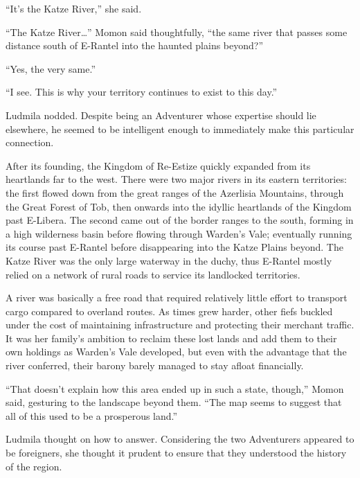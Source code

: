  

“It’s the Katze River,” she said.

 

“The Katze River…” Momon said thoughtfully, “the same river that passes some distance south of E-Rantel into the haunted plains beyond?”

 

“Yes, the very same.”

 

“I see. This is why your territory continues to exist to this day.”

 

Ludmila nodded. Despite being an Adventurer whose expertise should lie elsewhere, he seemed to be intelligent enough to immediately make this particular connection.

 

After its founding, the Kingdom of Re-Estize quickly expanded from its heartlands far to the west. There were two major rivers in its eastern territories: the first flowed down from the great ranges of the Azerlisia Mountains, through the Great Forest of Tob, then onwards into the idyllic heartlands of the Kingdom past E-Libera. The second came out of the border ranges to the south, forming in a high wilderness basin before flowing through Warden’s Vale; eventually running its course past E-Rantel before disappearing into the Katze Plains beyond. The Katze River was the only large waterway in the duchy, thus E-Rantel mostly relied on a network of rural roads to service its landlocked territories.

 

A river was basically a free road that required relatively little effort to transport cargo compared to overland routes. As times grew harder, other fiefs buckled under the cost of maintaining infrastructure and protecting their merchant traffic. It was her family’s ambition to reclaim these lost lands and add them to their own holdings as Warden’s Vale developed, but even with the advantage that the river conferred, their barony barely managed to stay afloat financially.

 

“That doesn’t explain how this area ended up in such a state, though,” Momon said, gesturing to the landscape beyond them. “The map seems to suggest that all of this used to be a prosperous land.”

 

Ludmila thought on how to answer. Considering the two Adventurers appeared to be foreigners, she thought it prudent to ensure that they understood the history of the region.

